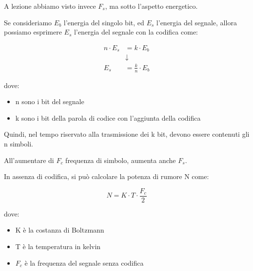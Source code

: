 \begin{tcolorbox}
    A lezione abbiamo visto invece $F_s$, ma sotto l'aspetto energetico. \newline 

    Se consideriamo $E_b$ l'energia del singolo bit, ed $E_s$ l'energia del segnale, 
    allora possiamo esprimere $E_s$ l'energia del segnale con la codifica come: 

    {
        \Large 
        \begin{equation}
            \begin{split}
                n \cdot E_s 
                &=
                k \cdot E_b
                \\
                &\downarrow 
                \\
                E_s &= \frac{k}{n} \cdot E_b
            \end{split}
        \end{equation}
    }

    dove: 

    \begin{itemize}
        \item n sono i bit del segnale 
        \item k sono i bit della parola di codice con l'aggiunta della codifica
    \end{itemize}
\end{tcolorbox}

Quindi, nel tempo riservato alla trasmissione dei k bit, 
devono essere contenuti gli n simboli. \newline 

All'aumentare di $F_c$ frequenza di simbolo, aumenta anche $F_s$. \newline 

In assenza di codifica, si può calcolare la potenza di rumore N come: 

{
    \Large 
    \begin{equation}
        N = K \cdot T \cdot \frac{F_c}{2}
    \end{equation}
}

dove: 

\begin{itemize}
    \item K è la costanza di Boltzmann 
    \item T è la temperatura in kelvin  
    \item $F_c$ è la frequenza del segnale senza codifica
\end{itemize}

